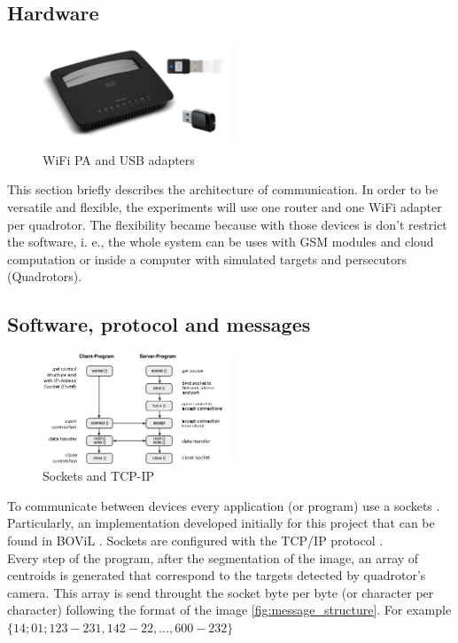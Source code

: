 \subsection{Hardware}
\begin{figure}
	\includegraphics[width=0.5\textwidth]{../Images/c2/hardware_comm.jpg}
	\caption{WiFi PA and USB adapters}
	\label{fig:hardwareComm}
\end{figure}

This section briefly describes the architecture of communication. In order to be versatile and flexible, the experiments will use one router and one WiFi adapter per quadrotor. The flexibility became because with those devices is don't restrict the software, i. e., the whole system can be uses with GSM modules and cloud computation or inside a computer with simulated targets and persecutors (Quadrotors).



\subsection{Software, protocol and messages}

\begin{figure}
	\begin{center}
		\includegraphics[width=0.5\textwidth, natwidth=448, natheight=263]{../Images/c2/socketstcpip.png}
	\end{center}
	\caption{Sockets and TCP-IP}
	\label{fig:socketstcpip}
\end{figure}

To communicate between devices every application (or program) use a sockets \cite{SocketWiki}. Particularly, an implementation developed initially for this project that can be found in BOViL \cite{BOViL}. Sockets are configured with the TCP/IP protocol \cite{TCPIP}. \\
Every step of the program, after the segmentation of the image, an array of centroids is generated that correspond to the targets detected by quadrotor's camera. This array is send throught the socket byte per byte (or character per character) following the format of the image \ref{fig:message_structure}. For example $\{14;01;123-231,142-22,...,600-232\}$


